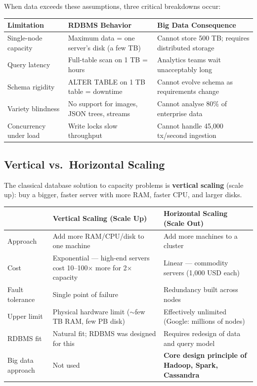 \documentclass[12pt,a4paper]{article}
\begin{document}
When data exceeds these assumptions, three critical breakdowns occur:

\begin{center}
\renewcommand{\arraystretch}{1.45}
\begin{tabular}{p{3.2cm}p{4.5cm}p{5.0cm}}
  \toprule
  \textbf{Limitation} & \textbf{RDBMS Behavior} & \textbf{Big Data Consequence} \\
  \midrule
  Single-node capacity & Maximum data = one server's disk (a few TB) & Cannot store 500 TB; requires distributed storage \\
  Query latency & Full-table scan on 1 TB = hours & Analytics teams wait unacceptably long \\
  Schema rigidity & ALTER TABLE on 1 TB table = downtime & Cannot evolve schema as requirements change \\
  Variety blindness & No support for images, JSON trees, streams & Cannot analyse 80\% of enterprise data \\
  Concurrency under load & Write locks slow throughput & Cannot handle 45{,}000 tx/second ingestion \\
  \bottomrule
\end{tabular}
\end{center}

\subsection{Vertical vs.\ Horizontal Scaling}

The classical database solution to capacity problems is \textbf{vertical scaling} (scale up): buy a bigger, faster server with more RAM, faster CPU, and larger disks.

\begin{center}
\renewcommand{\arraystretch}{1.4}
\begin{tabular}{p{3.0cm}p{5.0cm}p{4.8cm}}
  \toprule
  & \textbf{Vertical Scaling (Scale Up)} & \textbf{Horizontal Scaling (Scale Out)} \\
  \midrule
  Approach & Add more RAM/CPU/disk to one machine & Add more machines to a cluster \\
  Cost & Exponential — high-end servers cost 10--100$\times$ more for 2$\times$ capacity & Linear — commodity servers (1{,}000 USD each) \\
  Fault tolerance & Single point of failure & Redundancy built across nodes \\
  Upper limit & Physical hardware limit ($\sim$few TB RAM, few PB disk) & Effectively unlimited (Google: millions of nodes) \\
  RDBMS fit & Natural fit; RDBMS was designed for this & Requires redesign of data and query model \\
  Big data approach & Not used & \textbf{Core design principle of Hadoop, Spark, Cassandra} \\
  \bottomrule
\end{tabular}
\end{center}
\end{document}
